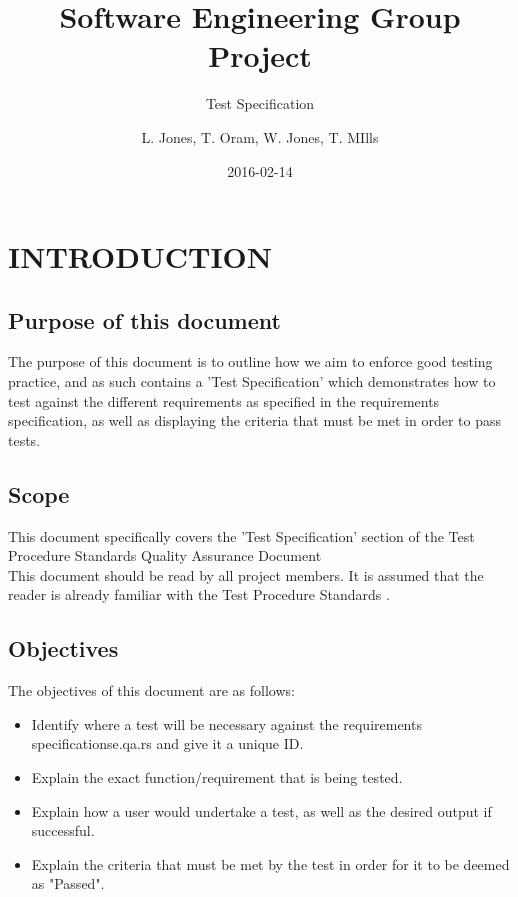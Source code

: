 \documentclass{project}
\begin{document}
\title{Software Engineering Group Project}
\subtitle{Test Specification}
\author{L. Jones, T. Oram, W. Jones, T. MIlls}     
\date{2016-02-14}
\maketitle
\tableofcontents
\newpage
\section{INTRODUCTION}
\subsection{Purpose of this document}
The purpose of this document is to outline how we aim to enforce good testing practice, and as such contains a 'Test Specification' which demonstrates how to test against the different requirements as specified in the requirements specification\cite{se.qa.rs}, as well as displaying the criteria that must be met in order to pass tests.
\subsection{Scope}
This document specifically covers the 'Test Specification' section of the Test Procedure Standards Quality Assurance Document\cite{se.qa.tps}\\
\newline
This document should be read by all project members. It is assumed that the reader is already familiar with the Test Procedure Standards \cite{se.qa.tps}.
\subsection{Objectives}
The objectives of this document are as follows:
\begin{itemize}
	\item Identify where a test will be necessary against the requirements specification{se.qa.rs} and give it a unique ID. 
	\item Explain the exact function/requirement that is being tested.
	\item Explain how a user would undertake a test, as well as the desired output if successful.
	\item Explain the criteria that must be met by the test in order for it to be deemed as "Passed".
\end{itemize} 
\clearpage
\end{document}
